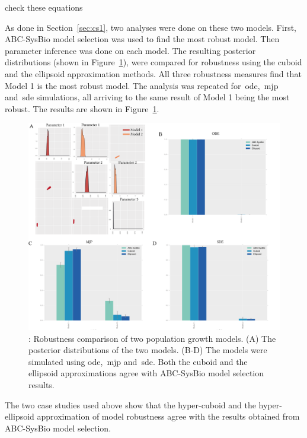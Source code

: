 {{\color{red} check these equations}

As done in Section~\ref{sec:cs1}, two analyses were done on these two models. First, ABC-SysBio model selection was used to find the most robust model. Then parameter inference was done on each model. The resulting posterior distributions (shown in Figure~\ref{fig:rob_sysbio4}), were compared for robustness using the cuboid and the ellipsoid approximation methods. All three robustness measures find that Model 1 is the most robust model. The analysis was repeated for~\acrshort{ode},~\acrshort{mjp} and~\acrshort{sde} simulations, all arriving to the same result of Model 1 being the most robust. The results are shown in Figure~\ref{fig:rob_sysbio4}.


\begin{figure}[p]
\begin{center}
\includegraphics[width=\textwidth]{chapterStabilityFinder/images/ex4_summ.png}
\caption[LoF caption]{\label{fig:rob_sysbio4}: Robustness comparison of two population growth models. (A) The posterior distributions of the two models. (B-D) The models were simulated using \acrshort{ode},~\acrshort{mjp} and~\acrshort{sde}. Both the cuboid and the ellipsoid approximations agree with ABC-SysBio model selection results. }
\end{center}
\end{figure}

\clearpage


The two case studies used above show that the hyper-cuboid and the hyper-ellipsoid approximation of model robustness agree with the results obtained from ABC-SysBio model selection. 

}
